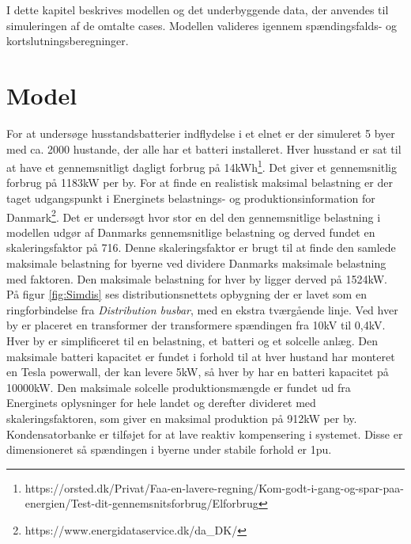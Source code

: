 

\label{Modelopbygning}
I dette kapitel beskrives modellen og det underbyggende data, der anvendes til simuleringen af de omtalte cases. Modellen valideres igennem spændingsfalds- og kortslutningsberegninger.

\section{Model}

For at undersøge husstandsbatterier indflydelse i et elnet er der simuleret 5 byer med ca. 2000 hustande, der alle har et batteri installeret. Hver husstand er sat til at have et gennemsnitligt dagligt forbrug på 14kWh\footnote{https://orsted.dk/Privat/Faa-en-lavere-regning/Kom-godt-i-gang-og-spar-paa-energien/Test-dit-gennemsnitsforbrug/Elforbrug}. Det giver et gennemsnitlig forbrug på 1183kW per by. For at finde en realistisk maksimal belastning er der taget udgangspunkt i Energinets belastnings- og produktionsinformation for Danmark\footnote{https://www.energidataservice.dk/da\_DK/}. Det er undersøgt hvor stor en del den gennemsnitlige belastning i modellen udgør af Danmarks gennemsnitlige belastning og derved fundet en skaleringsfaktor på 716. Denne skaleringsfaktor er brugt til at finde den samlede maksimale belastning for byerne ved dividere Danmarks maksimale belastning med faktoren. Den maksimale belastning for hver by ligger derved på 1524kW. \\
På figur \ref{fig:Simdis} ses distributionsnettets opbygning der er lavet som en ringforbindelse fra \textit{Distribution busbar}, med en ekstra tværgående linje. Ved hver by er placeret en transformer der transformere spændingen fra 10kV til 0,4kV. Hver by er simplificeret til en belastning, et batteri og et solcelle anlæg. Den maksimale batteri kapacitet er fundet i forhold til at hver hustand har monteret en Tesla powerwall, der kan levere 5kW, så hver by har en batteri kapacitet på 10000kW. Den maksimale solcelle produktionsmængde er fundet ud fra Energinets oplysninger for hele landet og derefter divideret med skaleringsfaktoren, som giver en maksimal produktion på 912kW per by. 
Kondensatorbanke er tilføjet for at lave reaktiv kompensering i systemet. Disse er dimensioneret så spændingen i byerne under stabile forhold er 1pu.

